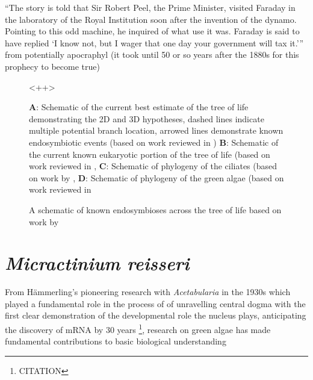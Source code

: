 ``The story is told that Sir Robert Peel, the Prime Minister, visited Faraday in the laboratory of the Royal Institution soon after the invention of the dynamo.
Pointing to this odd machine, he inquired of what use it was. Faraday is said to have replied `I know not, but I wager that one day your government will tax it.'''
from \citep{PearceWilliams1965} potentially apocraphyl (it took until 50 or so years after the 1880s for this prophecy to become true)


\begin{figure}
    \caption{\textbf{A}: Schematic of the current best estimate of the tree of life demonstrating the 2D and 3D hypotheses,
dashed lines indicate multiple potential branch location, arrowed lines demonstrate known endosymbiotic events (based on work reviewed in \citep{Gribaldo2010})
\textbf{B}: Schematic of the current known eukaryotic portion of the tree of life (based on work reviewed in \citep{Burki2014,Adl2013},
\textbf{C}: Schematic of phylogeny of the ciliates (based on work by \citep{Bachvaroff2011,},
\textbf{D}: Schematic of phylogeny of the green algae (based on work reviewed in \citep{Leliaert2012,}}
    <++>
\end{figure}

\begin{figure}
    \caption{A schematic of known endosymbioses across the tree of life based on work by \citep{Gribaldo2010,Wrede2012,vonDohlen2001}}
\end{figure}
%
%
%
%
%


\section{\textit{Micractinium reisseri}}
From H\"ammerling's pioneering research with \textit{Acetabularia} in the 1930s 
which played a fundamental role in the process of 
of unravelling central dogma with the first clear demonstration of the 
developmental role the nucleus plays, anticipating the discovery of mRNA by 30 years
\footnote{CITATION}, research on green algae has made fundamental contributions
to basic biological understanding

